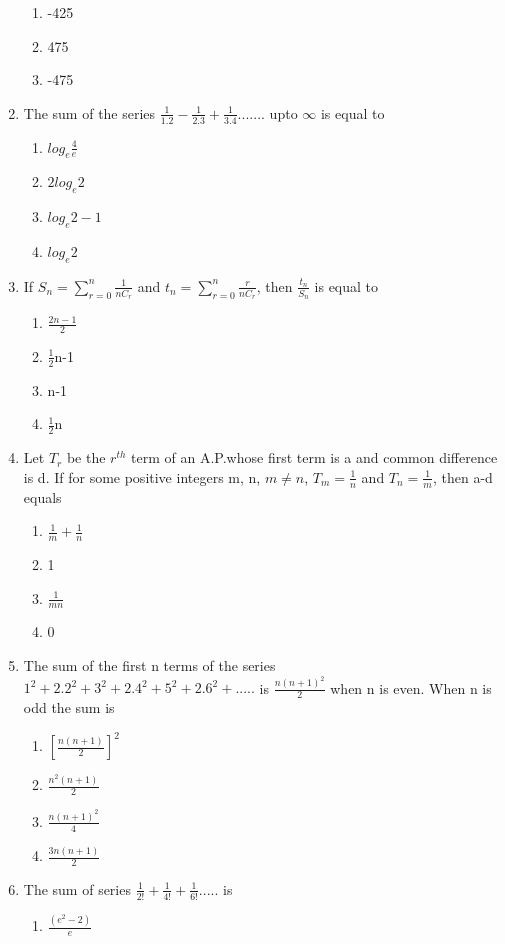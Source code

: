 \begin{enumerate}[label=\arabic*.,ref=\thesubsection.\theenumi]
\begin{enumerate}
\item -425   
\item 475  
\item -475
\end{enumerate}
\item The sum of the series $\frac{1}{1.2}-\frac{1}{2.3}+\frac{1}{3.4}.......$ upto $\infty$ is equal to 
\begin{enumerate}
\item $log_e\frac{4}{e}$
\item $2 log_e 2$   
\item $log_e 2-1$  
\item $log_e 2$
\end{enumerate}
\item If $S_n = \sum_{r=0}^{n}\frac{1}{nC_r}$ and $t_n = \sum_{r=0}^{n}\frac{r}{nC_r}$, then 
$\frac{t_n}{S_n}$ is equal to 
\begin{enumerate}
\item $\frac{2n-1}{2}$
\item $\frac{1}{2}$n-1   
\item  n-1 
\item $\frac{1}{2}$n
\end{enumerate}
\item Let $T_r$ be the $r^{th}$ term of an A.P.whose first term is a and common difference is d. If for some positive integers m, n, $m\neq n$, $T_m = \frac{1}{n}$ and $T_n = \frac{1}{m}$, then a-d equals
\begin{enumerate}
\item $\frac{1}{m}+\frac{1}{n}$
\item 1
\item $\frac{1}{mn}$
\item 0
\end{enumerate}
\item The sum of the first n terms of the series $1^2 + 2.2^2 + 3^2 + 2.4^2 + 5^2 + 2.6^2+.....$ is 
$\frac{n(n+1)^2}{2}$ when n is even. When n is odd the sum is 
\begin{enumerate}
\item $[\frac{n(n+1)}{2}]^2$
\item $\frac{n^2(n+1)}{2}$
\item $\frac{n(n+1)^2}{4}$
\item $\frac{3n(n+1)}{2}$
\end{enumerate}
\item The sum of series $\frac{1}{2!}+\frac{1}{4!}+\frac{1}{6!}.....$ is 
\begin{enumerate}
\item $\frac{(e^2 - 2)}{e}$

\end{enumerate}
\end{enumerate}
